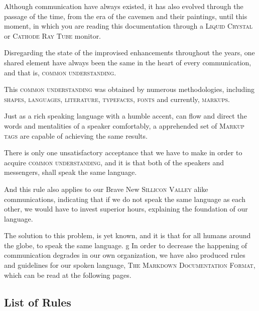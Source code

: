 \documentclass[13pt]{scrarticle}
\newcommand{\header}[1]{ \textsf{#1} \relax{}}
\newcommand{\name}[1]{{\textsc{#1}}}
\begin{document}
    Although communication have always existed,
    it has also evolved through the passage of the time,
    from the era of the cavemen and their paintings,
    until this moment,
    in which you are reading this documentation through a \name{Liquid Crystal} or \name{Cathode Ray Tube} monitor. \newline

    Disregarding the state of the improvised enhancements throughout the years,
    one shared element have always been the same in the heart of every communication,
    and that is, \name{common understanding}. \newline

    This \name{common understanding} was obtained by numerous methodologies,
    including \name{shapes}, \name{languages}, \name{literature}, \name{typefaces}, \name{fonts} and currently, \name{markups}. \newline

    Just as a rich speaking language with a humble accent, can flow and direct the words and mentalities of a speaker comfortably,
    a apprehended set of \name{Markup tags} are capable of achieving the same results. \newline


    \newpage
    There is only one unsatisfactory acceptance that we have to make in order to acquire
    \name{common understanding}, and it is that both of the speakers and messengers, shall speak the same language. \newline

    And this rule also applies to our Brave New \name{Sillicon Valley} alike communications,
    indicating that if we do not speak the same language as each other,
    we would have to invest superior hours, explaining the foundation of our language. \newline

    The solution to this problem, is yet known,
    and it is that for all humans around the globe, to speak the same language. \newline
g
    In order to decrease the happening of communication degrades in our own organization,
    we have also produced rules and guidelines for our spoken language, \name{The Markdown Documentation Format},
    which can be read at the following pages. \newline


    \newpage
    \subsection{\header{List of Rules}}
\end{document}
